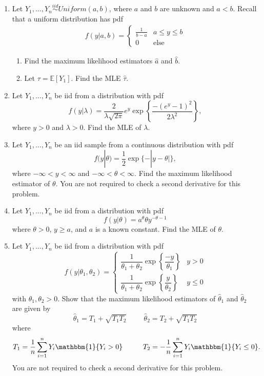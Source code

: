 \documentclass[11pt]{article}
\begin{document}
\begin{enumerate}
\item Let $Y_1,...,Y_n \overset{iid}{\sim} Uniform(a, b)$, where $a$ and $b$ are unknown and $a < b$. Recall that a uniform distribution has pdf
\begin{align*}
f(y|a,b) = \begin{cases}
\frac{1}{b - a} & a \leq y \leq b \\
0 & \text{else}
\end{cases}
\end{align*}
\begin{enumerate}
\item Find the maximum likelihood estimators $\widehat{a}$ and $\widehat{b}$.
\item Let $\tau = \mathbb{E}[Y_1]$. Find the MLE $\widehat{\tau}$.
\end{enumerate}

\bigskip

\item Let $Y_1,...,Y_n$ be iid from a distribution with pdf
$$f(y|\lambda) = \frac{2}{\lambda \sqrt{2 \pi}} e^y \exp \left\lbrace \frac{-(e^y - 1)^2}{2\lambda^2} \right\rbrace,$$
where $y > 0$ and $\lambda > 0$. Find the MLE of $\lambda$.

\bigskip

\item Let $Y_1,...,Y_n$ be an iid sample from a continuous distribution with pdf 
$$f(y|\theta) = \frac{1}{2} \exp\{-|y - \theta|\},$$
where $-\infty < y < \infty$ and $-\infty < \theta < \infty$. Find the maximum likelihood estimator of $\theta$. You are not required to check a second derivative for this problem. 

\bigskip

\item Let $Y_1,...,Y_n$ be iid from a distribution with pdf
$$f(y | \theta) = a^{\theta} \theta y^{-\theta - 1}$$
where $\theta > 0$, $y \geq a$, and $a$ is a known constant. Find the MLE of $\theta$.

\bigskip

\item Let $Y_1,...,Y_n$ be iid from a distribution with pdf
$$f(y | \theta_1, \theta_2) = \begin{cases} \dfrac{1}{\theta_1 + \theta_2} \exp\left\lbrace \dfrac{-y}{\theta_1}\right\rbrace & y > 0 \\ \dfrac{1}{\theta_1 + \theta_2} \exp\left\lbrace \dfrac{y}{\theta_2}\right\rbrace & y \leq 0 \end{cases}$$
with $\theta_1, \theta_2 > 0$. Show that the maximum likelihood estimators of $\widehat{\theta}_1$ and $\widehat{\theta}_2$ are given by
$$\widehat{\theta}_1= T_1 + \sqrt{T_1 T_2} \hspace{1cm} \widehat{\theta}_2 = T_2 + \sqrt{T_1 T_2}$$
where
$$T_1 = \frac{1}{n} \sum \limits_{i=1}^n Y_i \mathbbm{1}\{Y_i > 0\} \hspace{1cm} T_2 = -\frac{1}{n} \sum \limits_{i=1}^n Y_i \mathbbm{1}\{Y_i \leq 0\}.$$
You are not required to check a second derivative for this problem.

\end{enumerate}
\end{document}

